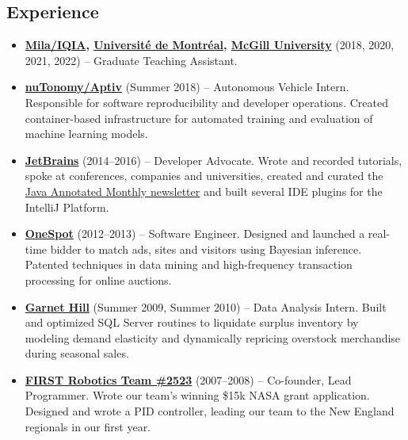 \documentclass[letterpaper,11pt]{article}
\newcommand{\resumeItem}[2]{
  \item\small{\textbf{#1}{ #2 }}
}
\newcommand{\resumeSubItem}[2]{\resumeItem{#1}{#2}}
\newcommand{\resumeSubHeadingListStart}{\begin{itemize}[leftmargin=*]}
\newcommand{\resumeSubHeadingListEnd}{\end{itemize}}
\begin{document}
\begin{justify}
\section{Experience}
\resumeSubHeadingListStart
\resumeSubItem{\href{https://mila.quebec/en/}{Mila/IQIA}, \href{https://www.umontreal.ca/}{Universit\'e de Montr\'eal}, \href{https://www.mcgill.ca/}{McGill University}}{(2018, 2020, 2021, 2022) -- Graduate Teaching Assistant.}
\resumeSubItem{\href{https://www.aptiv.com/}{nuTonomy/Aptiv}}{(Summer 2018) -- Autonomous Vehicle Intern. Responsible for software reproducibility and developer operations. Created container-based infrastructure for automated training and evaluation of machine learning models.}
\resumeSubItem{\href{https://www.jetbrains.com/}{JetBrains}}{(2014--2016) -- Developer Advocate. Wrote and recorded tutorials, spoke at conferences, companies and universities, created and curated the \href{https://blog.jetbrains.com/idea/tag/java-annotated/}{Java Annotated Monthly newsletter} and built several IDE plugins for the IntelliJ Platform.}
\resumeSubItem{\href{https://www.onespot.com/}{OneSpot}}{(2012--2013) -- Software Engineer. Designed and launched a real-time bidder to match ads, sites and visitors using Bayesian inference. Patented techniques in data mining and high-frequency transaction processing for online auctions.}
\resumeSubItem{\href{https://www.garnethill.com/}{Garnet Hill}}{(Summer 2009, Summer 2010) -- Data Analysis Intern. Built and optimized SQL Server routines to liquidate surplus inventory by modeling demand elasticity and dynamically repricing overstock merchandise during seasonal sales.}
\resumeSubItem{\href{https://www.firstinspires.org/}{FIRST Robotics Team \#2523}}{(2007--2008) -- Co-founder, Lead Programmer. Wrote our team's winning \$15k NASA grant application. Designed and wrote a PID controller, leading our team to the New England regionals in our first year.}
\resumeSubHeadingListEnd


\end{justify}
\end{document}
